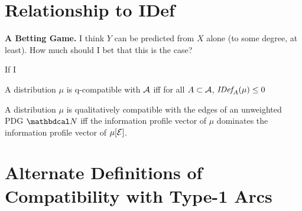 \documentclass{article}
\begin{document}
\clearpage
\section{Relationship to IDef}

\textbf{A Betting Game.} 
I think $Y$ can be predicted from $X$ alone (to some degree, at least).
How much should I bet that this is the case?

If I 

\begin{conj}
    A distribution $\mu$ is q-compatible with $\mathcal A$ iff for all $A \subset \mathcal A$, 
    $\mathit{IDef}_{\!A}(\mu) \le 0$
\end{conj}

\begin{conj}
    A distribution $\mu$ is qualitatively compatible with the edges of an unweighted PDG $\dg N$ iff 
    the information profile vector of $\mu$ dominates the information profile vector of $\mu[\mathcal E]$. 
\end{conj}


\appendix
\clearpage
\section{Alternate Definitions of Compatibility with Type-1 Arcs}
\end{document}
